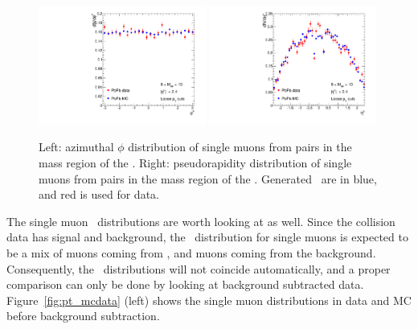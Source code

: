 \begin{figure}[h]
\begin{centering}  
  \includegraphics[width=0.49\textwidth]{Chapters/aCorrection/phi_aa_MC.pdf}
  \includegraphics[width=0.49\textwidth]{Chapters/aCorrection/eta_aa_MC.pdf}
  \caption{Left: azimuthal $\phi$ distribution of single muons from pairs in the mass
    region of the \PgU. Right: pseudorapidity distribution of single muons from pairs in the mass
    region of the \PgU. Generated \PgU\ are in blue, and red is used
    for data.
  }
  \label{phi,eta}
\end{centering}  
\end{figure}

The single muon \pt\ distributions are worth looking at as
well. Since the collision data has signal and background, the \pt\
distribution for single muons is expected to be a mix of muons coming
from \PgU, and muons coming from the background. Consequently, the
\pt\ distributions will not coincide automatically, and a proper
comparison can only be done by looking at background subtracted
data. Figure~\ref{fig:pt_mcdata} (left) shows the single muon
distributions in data and MC before background subtraction.


